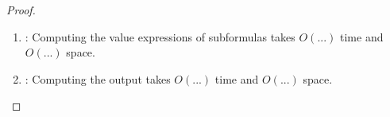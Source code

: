 \begin{proof}
\begin{enumerate}
		\item \TODO:
		Computing the value expressions of subformulas takes $O(...)$ time %
		and $O(...)$ space. %
		
		
		\item \TODO:
		Computing the output takes $O(...)$ time %
		and $O(...)$ space. %
	\end{enumerate}
	
%	
%	
	
%	
%	
%	
%	
%	
\end{proof}
